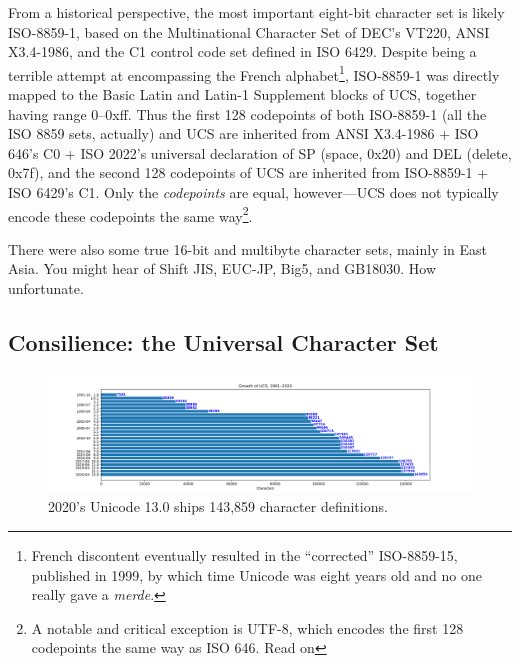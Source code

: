 From a historical perspective, the most important eight-bit character set
is likely ISO-8859-1\cite{iso8859}, based on the Multinational Character Set
of DEC's VT220, ANSI X3.4-1986, and the C1 control code set defined in ISO 6429.
Despite being a terrible attempt at encompassing the French alphabet\footnote{French
discontent eventually resulted in the ``corrected'' ISO-8859-15, published in
1999, by which time Unicode was eight years old and no one really gave a \textit{merde}\cite{french}.},
ISO-8859-1 was directly mapped to the Basic Latin and Latin-1 Supplement blocks
of UCS, together having range 0--0xff. Thus the first 128 codepoints of both 
ISO-8859-1 (all the ISO 8859 sets, actually) and UCS are inherited from ANSI
X3.4-1986 + ISO 646's C0 + ISO 2022's universal declaration of SP (space, 0x20) and
DEL (delete, 0x7f), and the second 128 codepoints of UCS are inherited
from ISO-8859-1 + ISO 6429's C1. Only the \textit{codepoints} are equal, however---UCS
does not typically encode these codepoints the same way\footnote{A notable
and critical exception is UTF-8, which encodes the first 128 codepoints the
same way as ISO 646. Read on\textellipsis}.

There were also some true 16-bit and multibyte character sets, mainly in East
Asia. You might hear of Shift JIS, EUC-JP, Big5, and GB18030. How unfortunate.

\subsection{Consilience: the Universal Character Set}
\label{sec:ucs}
\begin{figure}[!htb]
  \centering
  \includegraphics[width=1.1\linewidth]{media/unicode-growth.png}
  \caption{2020's Unicode 13.0 ships 143,859 character definitions.}
  \label{fig:unicodegrowth}
\end{figure}

